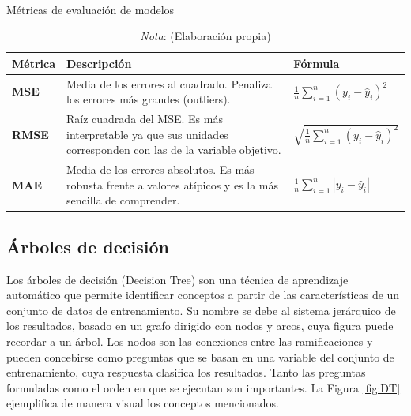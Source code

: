 \documentclass[12pt,a4paper]{report}
\begin{document}
\begin{table}[H]
\centering
\caption{\\ Métricas de evaluación de modelos}
\renewcommand{\arraystretch}{1.5} %
\begin{tabular}{>{\raggedright\arraybackslash}p{2.5cm} >{\raggedright\arraybackslash}p{9cm} >{\raggedright\arraybackslash}p{3.5cm}}
\toprule
\textbf{Métrica} & \textbf{Descripción} & \textbf{Fórmula} \\ 
\midrule
\textbf{MSE}   & Media de los errores al cuadrado. Penaliza los errores más grandes (outliers). & \( \frac{1}{n} \sum_{i=1}^{n} ( y_i - \hat{y}_i )^2 \) \\ \hline
\textbf{RMSE}  & Raíz cuadrada del MSE. Es más interpretable ya que sus unidades corresponden con las de la variable objetivo. & \( \sqrt{ \frac{1}{n} \sum_{i=1}^{n} ( y_i - \hat{y}_i )^2 } \) \\ \hline
\textbf{MAE}   & Media de los errores absolutos. Es más robusta frente a valores atípicos y es la más sencilla de comprender. & \( \frac{1}{n} \sum_{i=1}^{n} \left| y_i - \hat{y}_i \right| \) \\
\bottomrule
\end{tabular}
\renewcommand{\arraystretch}{1} %
\label{tbl:metrics}
\caption*{\textit{Nota}: (Elaboración propia)}
\end{table}



\subsection{Árboles de decisión}

Los árboles de decisión (Decision Tree) son una técnica de aprendizaje automático que permite identificar conceptos a partir de las características de un conjunto de datos de entrenamiento. Su nombre se debe al sistema jerárquico de los resultados, basado en un grafo dirigido con nodos y arcos, cuya figura puede recordar a un árbol. Los nodos son las conexiones entre las ramificaciones y pueden concebirse como preguntas que se basan en una variable del conjunto de entrenamiento, cuya respuesta clasifica los resultados. Tanto las preguntas formuladas como el orden en que se ejecutan son importantes. La Figura \ref{fig:DT} ejemplifica de manera visual los conceptos mencionados.
\end{document}
